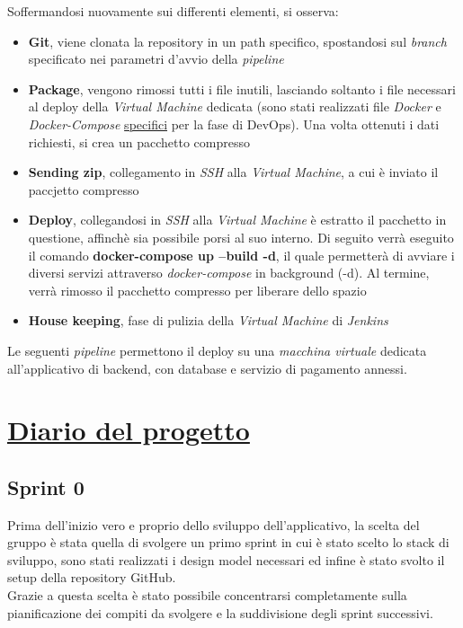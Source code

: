 \documentclass{article}
\begin{document}
Soffermandosi nuovamente sui differenti elementi, si osserva:
\begin{itemize}[label = {-}]
    \itemsep0em
    \item \textbf{Git}, viene clonata la repository in un path specifico, spostandosi sul \textit{branch} specificato nei parametri d'avvio della \textit{pipeline}
    \item \textbf{Package}, vengono rimossi tutti i file inutili, lasciando soltanto i file necessari al deploy della \textit{Virtual Machine} dedicata (sono stati realizzati file \textit{Docker} e \textit{Docker-Compose} \href{https://github.com/DavideDeRosa/storJ_SWE/tree/develop/CI_CD}{specifici} per la fase di DevOps). Una volta ottenuti i dati richiesti, si crea un pacchetto compresso
    \item \textbf{Sending zip}, collegamento in \textit{SSH} alla \textit{Virtual Machine}, a cui è inviato il paccjetto compresso
    \item \textbf{Deploy}, collegandosi in \textit{SSH} alla \textit{Virtual Machine} è estratto il pacchetto in questione, affinchè sia possibile porsi al suo interno. Di seguito verrà eseguito il comando \textbf{docker-compose up --build -d}, il quale permetterà di avviare i diversi servizi attraverso \textit{docker-compose} in background (-d). Al termine, verrà rimosso il pacchetto compresso per liberare dello spazio
    \item \textbf{House keeping}, fase di pulizia della \textit{Virtual Machine} di \textit{Jenkins}
\end{itemize}
Le seguenti \textit{pipeline} permettono il deploy su una \textit{macchina virtuale} dedicata all'applicativo di backend, con database e servizio di pagamento annessi.

\clearpage
\section*{\href{https://github.com/users/DavideDeRosa/projects/2}{Diario del progetto}}

\subsection*{Sprint 0}
Prima dell'inizio vero e proprio dello sviluppo dell'applicativo, la scelta del gruppo è stata quella di svolgere un primo sprint in cui è stato scelto lo stack di sviluppo, sono stati realizzati i design model necessari ed infine è stato svolto il setup della repository GitHub.\\
Grazie a questa scelta è stato possibile concentrarsi completamente sulla pianificazione dei compiti da svolgere e la suddivisione degli sprint successivi.
\end{document}
